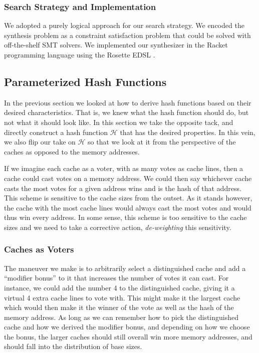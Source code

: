 \subsubsection{Search Strategy and Implementation}

We adopted a purely logical approach for our search strategy. We encoded the
synthesis problem as a constraint satisfaction problem that could be solved with
off-the-shelf SMT solvers. We implemented our synthesizer in the Racket
programming language using the Rosette EDSL \cite{rosette}.


\subsection{Parameterized Hash Functions}

In the previous section we looked at how to derive hash functions based on their
desired characteristics. That is, we knew what the hash function should do, but
not what it should look like. In this section we take the opposite tack, and
directly construct a hash function $\mathcal{H}$ that has the desired
properties. In this vein, we also flip our take on $\mathcal{H}$ so that we look
at it from the perspective of the caches as opposed to the memory addresses.

If we imagine each cache as a voter, with as many votes as cache lines, then a
cache could cast votes on a memory address.  We could then say whichever cache
casts the most votes for a given address wins and is the hash of that
address. This scheme is sensitive to the cache sizes from the outset. As it
stands however, the cache with the most cache lines would always cast the most
votes and would thus win every address.  In some sense, this scheme is too
sensitive to the cache sizes and we need to take a corrective action,
\textit{de-weighting} this sensitivity.

\subsubsection{Caches as Voters}
  
The maneuver we make is to arbitrarily select a distinguished cache and add a
``modifier bonus'' to it that increases the number of votes it can cast. For
instance, we could add the number 4 to the distinguished cache, giving it a
virtual 4 extra cache lines to vote with. This might make it the largest cache
which would then make it the winner of the vote as well as the hash of the
memory address.  As long as we can remember how to pick the distinguished cache
and how we derived the modifier bonus, and depending on how we choose the bonus,
the larger caches should still overall win more memory addresses, and should
fall into the distribution of base sizes.

